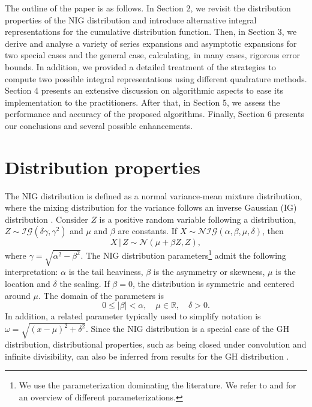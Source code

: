 \documentclass[10pt,a4paper,oneside]{article}
\numberwithin{equation}{section}
\begin{document}
The outline of the paper is as follows. In Section 2, we revisit the distribution properties of the NIG distribution and introduce alternative integral representations for the cumulative distribution function. Then, in Section 3, we derive and analyse a variety of series expansions and asymptotic expansions for two special cases and the general case, calculating, in many cases, rigorous error bounds. In addition, we provided a detailed treatment of the strategies to compute two possible integral representations using different quadrature methods. Section 4 presents an extensive discussion on algorithmic aspects to ease its implementation to the practitioners. After that, in Section 5, we assess the performance and accuracy of the proposed algorithms. Finally, Section 6 presents our conclusions and several possible enhancements.



\section{Distribution properties}

The NIG distribution is defined as a normal variance-mean mixture distribution, where the mixing distribution for the variance follows an inverse Gaussian (IG) distribution \cite{Paolella2007}. Consider $Z$ is a positive random variable following a distribution, $Z \sim \mathcal{IG}(\delta \gamma, \gamma^2)$ and $\mu$ and $\beta$ are constants. If $X \sim \mathcal{NIG}(\alpha, \beta, \mu, \delta)$, then
\begin{equation}
X \,|\, Z \sim \mathcal{N}(\mu + \beta Z, Z),
\end{equation}
where $\gamma = \sqrt{\alpha^2 - \beta^2}$.
The NIG distribution parameters\footnote{We use the parameterization dominating the literature. We refer to \cite{Paolella2007} and \cite{Prause1999} for an overview of different parameterizations.} admit the following interpretation: $\alpha$ is the tail heaviness, $\beta$ is the asymmetry or skewness, $\mu$ is the location and $\delta$ the scaling. If $\beta = 0$, the distribution is symmetric and centered around $\mu$. The domain of the parameters is
\begin{equation}
0 \le |\beta| < \alpha, \quad \mu \in \mathbb{R}, \quad \delta  > 0.
\end{equation}
In addition, a related parameter typically used to simplify notation is $\omega = \sqrt{(x-\mu)^2 + \delta^2}$.
Since the NIG distribution is a special case of the GH distribution, distributional properties, such as being closed under convolution and infinite divisibility, can also be inferred from results for the GH distribution \cite{Paolella2007}.
\end{document}

